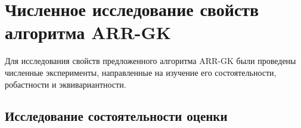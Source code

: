 







\section{Численное исследование свойств алгоритма ARR-GK}

Для исследования свойств предложенного алгоритма ARR-GK были проведены численные эксперименты, направленные на изучение его состоятельности, робастности и эквивариантности. 

\subsection*{Исследование состоятельности оценки}

